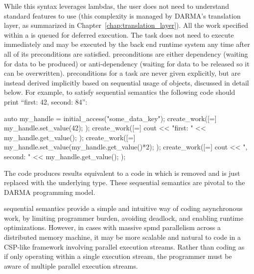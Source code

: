 While this syntax leverages  \glspl{lambda}, the user does not need to
understand  standard features to use  (this
complexity is managed by \gls{DARMA}'s \gls{translation layer}, as summarized in Chapter~\ref{chap:translation_layer}). 
All the work specified within a  is queued for
\gls{deferred execution}.  The \gls{task} does not need to execute immediately 
and may be executed by the \gls{back end} \gls{runtime system} any time after
all of its \glspl{precondition} are satisfied. 
\Glspl{precondition} are either \gls{dependency} (waiting for data to be produced) or
\gls{anti-dependency} (waiting for data to be released so it can be overwritten).   
\Glspl{precondition} for a \gls{task} are never given explicitly, but are instead derived 
implicitly based on sequential usage of  objects, discussed in detail below.
For example, to satisfy \gls{sequential semantics} the following code should print ``first: 42, second: 84'':
\begin{CppCode}
auto my_handle = initial_access("some_data_key");
create_work([=]{
  my_handle.set_value(42);
});
create_work([=]{
  cout << "first: " << my_handle.get_value();
});
create_work([=]{
  my_handle.set_value(my_handle.get_value()*2);
});
create_work([=]{
  cout << ", second: " << my_handle.get_value();
});
\end{CppCode}
The code produces results equivalent to a \CC{} code in which  
is removed and  is just replaced with the underlying type.
These \gls{sequential semantics} are pivotal to the \gls{DARMA}
\gls{programming model}.

\Gls{sequential semantics} provide a simple and intuitive way of coding
asynchronous work, by limiting programmer burden, avoiding deadlock,
and enabling runtime optimizations.
However, in cases with massive \gls{spmd} parallelism across a distributed memory machine,
it may be more scalable and natural to code in a \gls{CSP}-like framework
involving parallel \glspl{execution stream}.
Rather than coding as if only operating within a single \gls{execution stream}, 
the programmer must be aware of multiple parallel \glspl{execution stream}.

